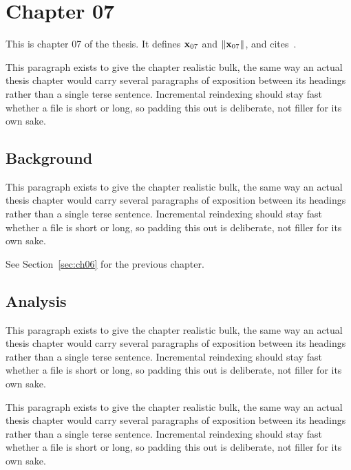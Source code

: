 \section{Chapter 07}
\label{sec:ch07}

This is chapter 07 of the thesis. It defines $\mathbf{x}_{07}$ and $\lVert \mathbf{x}_{07} \rVert$, and cites~\cite{ref1}.

This paragraph exists to give the chapter realistic bulk, the same way an actual thesis chapter would carry several paragraphs of exposition between its headings rather than a single terse sentence. Incremental reindexing should stay fast whether a file is short or long, so padding this out is deliberate, not filler for its own sake.

\subsection{Background}
\label{sec:ch07:background}

This paragraph exists to give the chapter realistic bulk, the same way an actual thesis chapter would carry several paragraphs of exposition between its headings rather than a single terse sentence. Incremental reindexing should stay fast whether a file is short or long, so padding this out is deliberate, not filler for its own sake.

See Section~\ref{sec:ch06} for the previous chapter.

\subsection{Analysis}
\label{sec:ch07:analysis}

This paragraph exists to give the chapter realistic bulk, the same way an actual thesis chapter would carry several paragraphs of exposition between its headings rather than a single terse sentence. Incremental reindexing should stay fast whether a file is short or long, so padding this out is deliberate, not filler for its own sake.

This paragraph exists to give the chapter realistic bulk, the same way an actual thesis chapter would carry several paragraphs of exposition between its headings rather than a single terse sentence. Incremental reindexing should stay fast whether a file is short or long, so padding this out is deliberate, not filler for its own sake.
